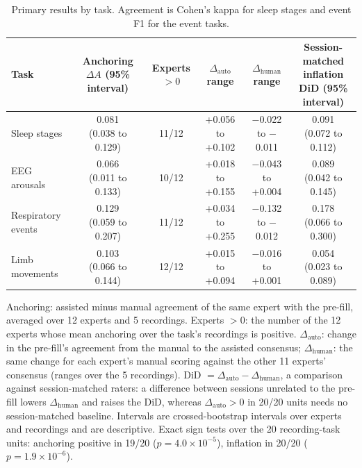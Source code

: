 \begin{table}[tbp]
\centering
\footnotesize
\caption{Primary results by task. Agreement is Cohen's kappa for sleep stages and event F1 for the event tasks.}
\label{tab:primary}
\begin{adjustbox}{max width=\linewidth}
\begin{tabular}{lccccc}
\toprule
Task & \makecell{Anchoring $\Delta A$\\(95\% interval)} & \makecell{Experts\\$>0$} & \makecell{$\Delta_{\mathrm{auto}}$\\range} & \makecell{$\Delta_{\mathrm{human}}$\\range} & \makecell{Session-matched\\inflation DiD (95\% interval)} \\
\midrule
Sleep stages & \makecell{0.081\\(0.038 to 0.129)} & 11/12 & +0.056 to +0.102 & \ensuremath{-}0.022 to \ensuremath{-}0.011 & \makecell{0.091\\(0.072 to 0.112)} \\
EEG arousals & \makecell{0.066\\(0.011 to 0.133)} & 10/12 & +0.018 to +0.155 & \ensuremath{-}0.043 to +0.004 & \makecell{0.089\\(0.042 to 0.145)} \\
Respiratory events & \makecell{0.129\\(0.059 to 0.207)} & 11/12 & +0.034 to +0.255 & \ensuremath{-}0.132 to \ensuremath{-}0.012 & \makecell{0.178\\(0.066 to 0.300)} \\
Limb movements & \makecell{0.103\\(0.066 to 0.144)} & 12/12 & +0.015 to +0.094 & \ensuremath{-}0.016 to +0.001 & \makecell{0.054\\(0.023 to 0.089)} \\
\bottomrule
\end{tabular}
\end{adjustbox}
\par\smallskip
\begin{minipage}{0.95\linewidth}\footnotesize Anchoring: assisted minus manual agreement of the same expert with the pre-fill, averaged over 12 experts and 5 recordings. Experts $>0$: the number of the 12 experts whose mean anchoring over the task's recordings is positive. $\Delta_{\mathrm{auto}}$: change in the pre-fill's agreement from the manual to the assisted consensus; $\Delta_{\mathrm{human}}$: the same change for each expert's manual scoring against the other 11 experts' consensus (ranges over the 5 recordings). DiD $=\Delta_{\mathrm{auto}}-\Delta_{\mathrm{human}}$, a comparison against session-matched raters: a difference between sessions unrelated to the pre-fill lowers $\Delta_{\mathrm{human}}$ and raises the DiD, whereas $\Delta_{\mathrm{auto}}>0$ in 20/20 units needs no session-matched baseline. Intervals are crossed-bootstrap intervals over experts and recordings and are descriptive. Exact sign tests over the 20 recording-task units: anchoring positive in 19/20 ($p=\ensuremath{4.0\times10^{-5}}$), inflation in 20/20 ($p=\ensuremath{1.9\times10^{-6}}$).\end{minipage}
\end{table}
